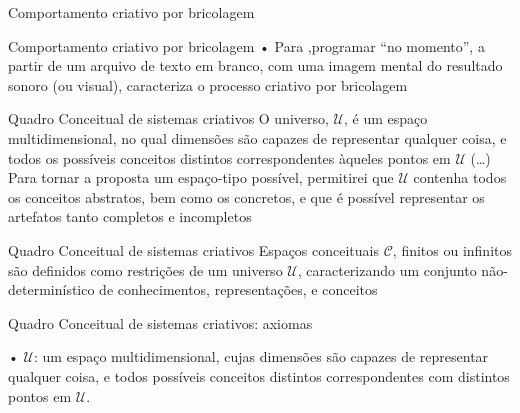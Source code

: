 \documentclass[aspectratio=169]{beamer}
\begin{document}

\begin{frame}{Comportamento criativo por bricolagem}
\haskellC
\end{frame}

\begin{frame}{Comportamento criativo por bricolagem}
• Para ,programar ``no momento'', a partir de um arquivo de texto em branco, com uma imagem mental do resultado sonoro (ou visual), caracteriza o processo criativo por bricolagem

\end{frame}

\begin{frame}{Quadro Conceitual de sistemas criativos}
O universo, $\mathcal{U}$, é um espaço multidimensional, no qual dimensões são capazes de representar qualquer coisa, e todos os possíveis conceitos distintos correspondentes àqueles pontos em $\mathcal{U}$ (\ldots) Para tornar a proposta um espaço-tipo possível, permitirei que $\mathcal{U}$ contenha todos os conceitos abstratos, bem como os concretos, e que é possível representar os artefatos tanto completos e incompletos \cite[p.~451]{wiggins_framework_2006}
\end{frame}

\begin{frame}{Quadro Conceitual de sistemas criativos}
Espaços conceituais $\mathcal{C}$, finitos ou infinitos são definidos como restrições de um universo $\mathcal{U}$, caracterizando um conjunto não-determinístico de conhecimentos, representações, e conceitos
\end{frame}

\begin{frame}{Quadro Conceitual de sistemas criativos: axiomas}

• $\mathcal{U}$: um espaço multidimensional, cujas dimensões são capazes de representar qualquer coisa, e todos possíveis conceitos distintos correspondentes com distintos pontos em $\mathcal{U}$.
\end{frame}
\end{document}
